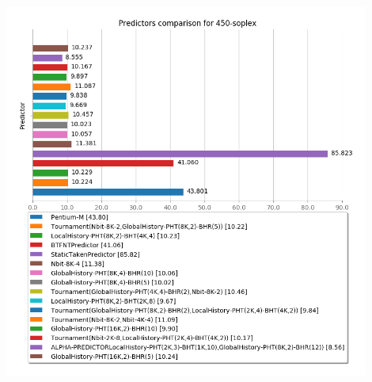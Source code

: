    \begin{minipage}{\textwidth}
      \begin{center}
         \\
         \vspace{3mm}
         \includegraphics[width=0.9\textwidth, frame]{./graphs/4-5/450-soplex.png}
         \vspace{6mm}
      \end{center}
   \end{minipage}

